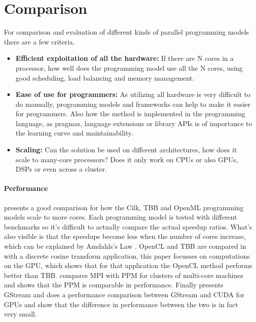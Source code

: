 \section{Comparison}



For comparison and evaluation of different kinds of parallel programming
models there are a few criteria.

\begin{itemize}
	\item \textbf{Efficient exploitation of all the hardware:} If there are N
		cores in a processor, how well does the programming model use all the N
		cores, using good scheduling, load balancing and memory management.
	\item \textbf{Ease of use for programmers:} As utilizing all hardware is
		very difficult to do manually, programming models and frameworks can
		help to make it easier for programmers. Also how the
		method is implemented in the programming language, as pragmas, language
		extensions or library APIs is of importance to the learning curve and maintainability.
	\item \textbf{Scaling:} Can the solution be used on different
		architectures, how does it scale to many-core processors? Does it only
		work on CPUs or also GPUs, DSPs or even across a cluster.
\end{itemize}

\paragraph{Performance} \cite{CaoPerformanceAnalysis} presents a good
comparison for how the Cilk, TBB and OpenML programming models scale to more
cores. Each programming model is tested with different benchmarks so it's
difficult to actually compare the actual speedup ratios. What's also visible is
that the speedups become less when the number of cores increase, which can be
explained by Amdahls's Law \cite{hennessy2007computer}. OpenCL and TBB are
compared in \cite{KimExploitingMultiManyCore} with a discrete cosine transform
application, this paper focusses on computations on the GPU, which shows that
for that application the OpenCL method performs better than TBB.
\cite{BrightwellParallelPhaseModel} compares MPI with PPM for clusters of
multi-core machines and shows that the PPM is comparable in performance.
Finally \cite{ZhangDataParallelProgramming} presents GStream and does a
performance comparison between GStream and CUDA for GPUs and show that the
difference in performance between the two is in fact very small.

